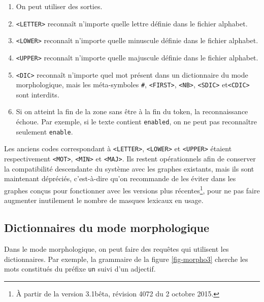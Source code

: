 \begin{enumerate}
\item On peut utiliser des sorties.
   
\item \verb+<LETTER>+ reconnaît n'importe quelle lettre définie dans le fichier alphabet.

\item \verb+<LOWER>+ reconnaît n'importe quelle minuscule définie dans le fichier alphabet.

\item \verb+<UPPER>+ reconnaît n'importe quelle majuscule définie dans le fichier alphabet.

\item \verb+<DIC>+ reconnaît n'importe quel mot présent dans un dictionnaire du mode
	 morphologique, mais les méta-symboles \verb+#+, \verb+<FIRST>+,  \verb+<NB>+,
 	 \verb+<SDIC>+ et\verb+<CDIC>+ sont interdits.\index{\verb+#+}     
\item Si on atteint la fin de la zone sans être à la fin du token, la reconnaissance échoue.
	Par exemple, si le texte contient \verb+enabled+, on ne peut pas reconnaître seulement
	\verb+enable+.
\end{enumerate}

\noindent  Les anciens codes correspondant à \verb+<LETTER>+, \verb+<LOWER>+ et \verb+<UPPER>+
 étaient respectivement \verb+<MOT>+, \verb+<MIN>+ et \verb+<MAJ>+.
 Ils restent opérationnels afin de conserver la compatibilité descendante
 du système avec les graphes existants, mais ils sont maintenant dépréciés,
 c'est-à-dire qu'on recommande de les éviter dans les graphes conçus pour fonctionner avec les versions plus récentes\footnote{À partir de la version 3.1bêta, révision 4072 du 2 octobre 2015.},
pour ne pas faire augmenter inutilement le nombre de masques lexicaux en usage.

\subsection{Dictionnaires du mode morphologique}
\label{dic-mode-morpho}
Dans le mode morphologique, on peut faire des requêtes qui utilisent les dictionnaires.
Par exemple,  la grammaire de la figure \ref{fig-morpho3} cherche les mots constitués du préfixe \verb+un+ suivi d'un adjectif.

